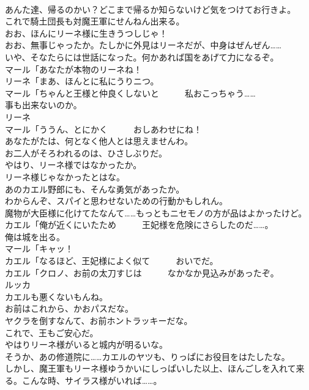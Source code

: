 \documentclass[8pt]{extreport}
\begin{document}
\begin{CJK}{UTF8}{min}
\\	あんた達、帰るのかい？どこまで帰るか知らないけど気をつけてお行きよ。	
\\	これで騎土団長も対魔王軍にせんねん出来る。	
\\	おお、ほんにリーネ様に生きうつしじゃ！	
\\	おお、無事じゃったか。たしかに外見はリーネだが、中身はぜんぜん……	
\\	いや、そなたらには世話になった。何かあれば国をあげて力になるぞ。	
\\	マール「あなたが本物のリーネね！	
\\	リーネ「まあ、ほんとに私にうりニつ。	
\\	マール「ちゃんと王様と仲良くしないと　　　私おこっちゃう……	
\\	事も出来ないのか。	
\\	リーネ
\\	マール「ううん、とにかく　　　おしあわせにね！	
\\	あなたがたは、何となく他人とは思えませんわ。	
\\	お二人がそろわれるのは、ひさしぶりだ。	
\\	やはり、リーネ様ではなかったか。	
\\	リーネ様じゃなかったとはな。	
\\	あのカエル野郎にも、そんな勇気があったか。	
\\	わからんぞ、スパイと思わせないための行動かもしれん。	
\\	魔物が大臣様に化けてたなんて……もっともニセモノの方が品はよかったけど。	
\\	カエル「俺が近くにいたため　　　王妃様を危険にさらしたのだ……。	
\\	俺は城を出る。	
\\	マール「キャッ！	
\\	カエル「なるほど、王妃様によく似て　　　おいでだ。	
\\	カエル「クロノ、お前の太刀すじは　　　なかなか見込みがあったぞ。	
\\	ルッカ
\\	カエルも悪くないもんね。	
\\	お前はこれから、かおパスだな。	
\\	ヤクラを倒すなんて、お前ホントラッキーだな。	
\\	これで、王もご安心だ。	
\\	やはりリーネ様がいると城内が明るいな。	
\\	そうか、あの修道院に……カエルのヤツも、りっぱにお役目をはたしたな。	
\\	しかし、魔王軍もリーネ様ゆうかいにしっぱいした以上、ほんごしを入れて来る。こんな時、サイラス様がいれば……。	

\end{CJK}
\end{document}
